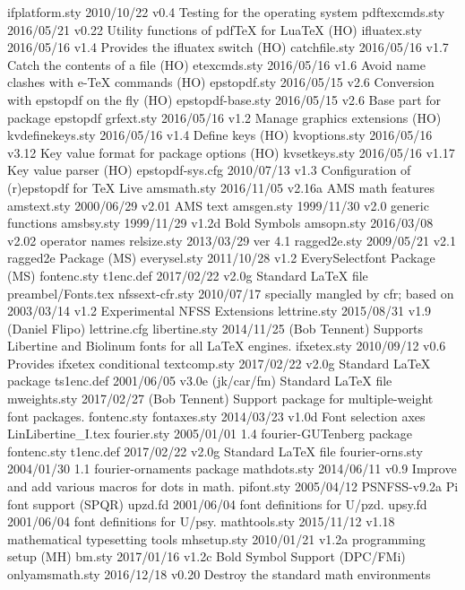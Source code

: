 ifplatform.sty    2010/10/22 v0.4 Testing for the operating system
pdftexcmds.sty    2016/05/21 v0.22 Utility functions of pdfTeX for LuaTeX (HO)
ifluatex.sty    2016/05/16 v1.4 Provides the ifluatex switch (HO)
catchfile.sty    2016/05/16 v1.7 Catch the contents of a file (HO)
etexcmds.sty    2016/05/16 v1.6 Avoid name clashes with e-TeX commands (HO)
epstopdf.sty    2016/05/15 v2.6 Conversion with epstopdf on the fly (HO)
epstopdf-base.sty    2016/05/15 v2.6 Base part for package epstopdf
  grfext.sty    2016/05/16 v1.2 Manage graphics extensions (HO)
kvdefinekeys.sty    2016/05/16 v1.4 Define keys (HO)
kvoptions.sty    2016/05/16 v3.12 Key value format for package options (HO)
kvsetkeys.sty    2016/05/16 v1.17 Key value parser (HO)
epstopdf-sys.cfg    2010/07/13 v1.3 Configuration of (r)epstopdf for TeX Live
 amsmath.sty    2016/11/05 v2.16a AMS math features
 amstext.sty    2000/06/29 v2.01 AMS text
  amsgen.sty    1999/11/30 v2.0 generic functions
  amsbsy.sty    1999/11/29 v1.2d Bold Symbols
  amsopn.sty    2016/03/08 v2.02 operator names
 relsize.sty    2013/03/29 ver 4.1
ragged2e.sty    2009/05/21 v2.1 ragged2e Package (MS)
everysel.sty    2011/10/28 v1.2 EverySelectfont Package (MS)
 fontenc.sty
   t1enc.def    2017/02/22 v2.0g Standard LaTeX file
preambel/Fonts.tex
nfssext-cfr.sty    2010/07/17 specially mangled by cfr; based on 2003/03/14 v1.2 Experimental NFSS Extensions
lettrine.sty    2015/08/31 v1.9 (Daniel Flipo)
lettrine.cfg
libertine.sty    2014/11/25 (Bob Tennent) Supports Libertine and Biolinum fonts for all LaTeX engines.
 ifxetex.sty    2010/09/12 v0.6 Provides ifxetex conditional
textcomp.sty    2017/02/22 v2.0g Standard LaTeX package
  ts1enc.def    2001/06/05 v3.0e (jk/car/fm) Standard LaTeX file
mweights.sty    2017/02/27 (Bob Tennent) Support package for multiple-weight font packages. 
 fontenc.sty
fontaxes.sty    2014/03/23 v1.0d Font selection axes
LinLibertine_I.tex
 fourier.sty    2005/01/01 1.4 fourier-GUTenberg package
 fontenc.sty
   t1enc.def    2017/02/22 v2.0g Standard LaTeX file
fourier-orns.sty    2004/01/30 1.1 fourier-ornaments package
mathdots.sty    2014/06/11 v0.9 Improve and add various macros for dots in math.
  pifont.sty    2005/04/12 PSNFSS-v9.2a Pi font support (SPQR) 
    upzd.fd    2001/06/04 font definitions for U/pzd.
    upsy.fd    2001/06/04 font definitions for U/psy.
mathtools.sty    2015/11/12 v1.18 mathematical typesetting tools
 mhsetup.sty    2010/01/21 v1.2a programming setup (MH)
      bm.sty    2017/01/16 v1.2c Bold Symbol Support (DPC/FMi)
onlyamsmath.sty    2016/12/18 v0.20 Destroy the standard math environments
